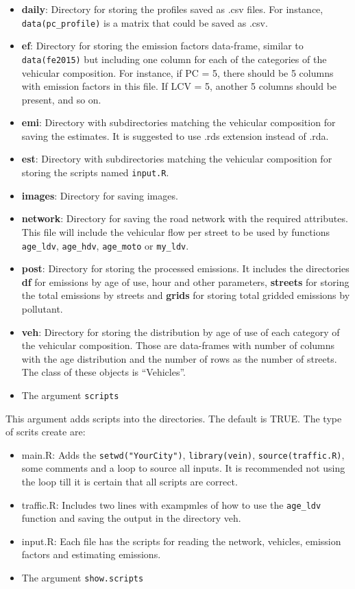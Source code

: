 \documentclass[12pt,graybox,envcountchap,sectrefs]{krantz}
\theoremstyle{definition}
\theoremstyle{definition}
\theoremstyle{definition}
\theoremstyle{remark}
\begin{document}
\begin{itemize}
\item
  \textbf{daily}: Directory for storing the profiles saved as .csv
  files. For instance, \texttt{data(pc\_profile)} is a matrix that could
  be saved as .csv.
\item
  \textbf{ef}: Directory for storing the emission factors data-frame,
  similar to \texttt{data(fe2015)} but including one column for each of
  the categories of the vehicular composition. For instance, if PC = 5,
  there should be 5 columns with emission factors in this file. If LCV =
  5, another 5 columns should be present, and so on.
\item
  \textbf{emi}: Directory with subdirectories matching the vehicular
  composition for saving the estimates. It is suggested to use .rds
  extension instead of .rda.
\item
  \textbf{est}: Directory with subdirectories matching the vehicular
  composition for storing the scripts named \texttt{input.R}.
\item
  \textbf{images}: Directory for saving images.
\item
  \textbf{network}: Directory for saving the road network with the
  required attributes. This file will include the vehicular flow per
  street to be used by functions \texttt{age\_ldv}, \texttt{age\_hdv},
  \texttt{age\_moto} or \texttt{my\_ldv}.
\item
  \textbf{post}: Directory for storing the processed emissions. It
  includes the directories \textbf{df} for emissions by age of use, hour
  and other parameters, \textbf{streets} for storing the total emissions
  by streets and \textbf{grids} for storing total gridded emissions by
  pollutant.
\item
  \textbf{veh}: Directory for storing the distribution by age of use of
  each category of the vehicular composition. Those are data-frames with
  number of columns with the age distribution and the number of rows as
  the number of streets. The class of these objects is ``Vehicles''.
\item
  The argument \texttt{scripts}
\end{itemize}

This argument adds scripts into the directories. The default is TRUE.
The type of scrits create are:

\begin{itemize}
\item
  main.R: Adds the \texttt{setwd("YourCity")}, \texttt{library(vein)},
  \texttt{source(traffic.R)}, some comments and a loop to source all
  inputs. It is recommended not using the loop till it is certain that
  all scripts are correct.
\item
  traffic.R: Includes two lines with exampmles of how to use the
  \texttt{age\_ldv} function and saving the output in the directory veh.
\item
  input.R: Each file has the scripts for reading the network, vehicles,
  emission factors and estimating emissions.
\item
  The argument \texttt{show.scripts}
\end{itemize}
\end{document}
